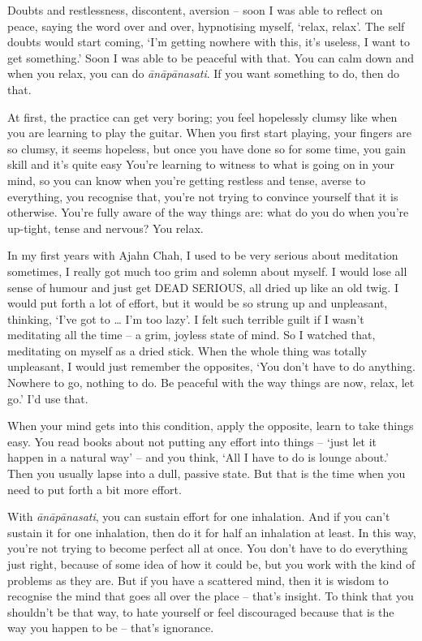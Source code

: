 Doubts and restlessness, discontent, aversion -- soon I was able to reflect on peace, saying the word over and over, hypnotising myself, `relax, relax'. The self doubts would start coming, `I'm getting nowhere with this, it's useless, I want to get something.' Soon I was able to be peaceful with that. You can calm down and when you relax, you can do \textit{\=an\=ap\=anasati}. If you want something to do, then do that.

At first, the practice can get very boring; you feel hopelessly clumsy like when you are learning to play the guitar. When you first start playing, your fingers are so clumsy, it seems hopeless, but once you have done so for some time, you gain skill and it's quite easy You're learning to witness to what is going on in your mind, so you can know when you're getting restless and tense, averse to everything, you recognise that, you're not trying to convince yourself that it is otherwise. You're fully aware of the way things are: what do you do when you're up-tight, tense and nervous? You relax.

In my first years with Ajahn Chah, I used to be very serious about meditation sometimes, I really got much too grim and solemn about myself. I would lose all sense of humour and just get DEAD SERIOUS, all dried up like an old twig. I would put forth a lot of effort, but it would be so strung up and unpleasant, thinking, `I've got to \ldots{} I'm too lazy'. I felt such terrible guilt if I wasn't meditating all the time -- a grim, joyless state of mind. So I watched that, meditating on myself as a dried stick. When the whole thing was totally unpleasant, I would just remember the opposites, `You don't have to do anything. Nowhere to go, nothing to do. Be peaceful with the way things are now, relax, let go.' I'd use that.

When your mind gets into this condition, apply the opposite, learn to take things easy. You read books about not putting any effort into things -- `just let it happen in a natural way' -- and you think, `All I have to do is lounge about.' Then you usually lapse into a dull, passive state. But that is the time when you need to put forth a bit more effort.

With \textit{\=an\=ap\=anasati}, you can sustain effort for one inhalation. And if you can't sustain it for one inhalation, then do it for half an inhalation at least. In this way, you're not trying to become perfect all at once. You don't have to do everything just right, because of some idea of how it could be, but you work with the kind of problems as they are. But if you have a scattered mind, then it is wisdom to recognise the mind that goes all over the place -- that's insight. To think that you shouldn't be that way, to hate yourself or feel discouraged because that is the way you happen to be -- that's ignorance.

